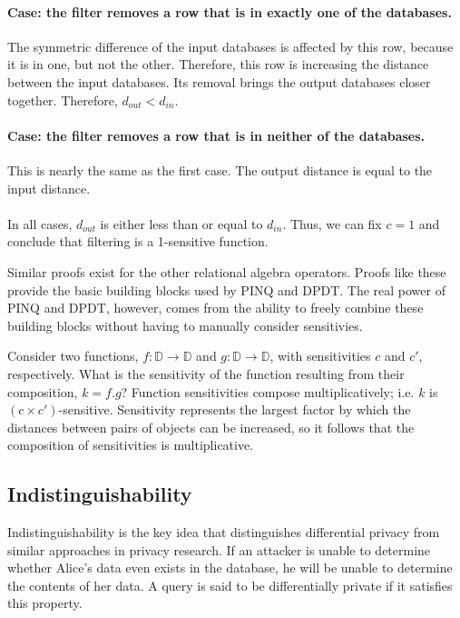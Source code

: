 \documentclass[12pt]{article}
\begin{document}
\paragraph{Case: the filter removes a row that is in exactly one of the databases.}
The symmetric difference of the input databases is affected by this row, because it is in one, but not the other.
Therefore, this row is increasing the distance between the input databases.
Its removal brings the output databases closer together.
Therefore, $d_{out} < d_{in}$.

\paragraph{Case: the filter removes a row that is in neither of the databases.}
This is nearly the same as the first case.
The output distance is equal to the input distance.

\paragraph{} %
In all cases, $d_{out}$ is either less than or equal to $d_{in}$.
Thus, we can fix $c=1$ and conclude that filtering is a 1-sensitive function.

Similar proofs exist for the other relational algebra operators.
Proofs like these provide the basic building blocks used by PINQ and DPDT.
The real power of PINQ and DPDT, however, comes from the ability to freely combine these building blocks without having to manually consider sensitivies.

Consider two functions, $f : \mathbb D \rightarrow \mathbb D$ and $g : \mathbb D \rightarrow \mathbb D$, with sensitivities $c$ and $c'$, respectively.
What is the sensitivity of the function resulting from their composition, $k = f . g$?
Function sensitivities compose multiplicatively; i.e. $k$ is $(c\times c')$-sensitive.
Sensitivity represents the largest factor by which the distances between pairs of objects can be increased, so it follows that the composition of sensitivities is multiplicative.

\subsection{Indistinguishability}

Indistinguishability is the key idea that distinguishes differential privacy from similar approaches in privacy research.
If an attacker is unable to determine whether Alice's data even exists in the database, he will be unable to determine the contents of her data.
A query is said to be differentially private if it satisfies this property.
\end{document}
